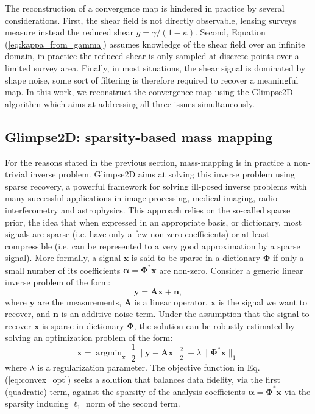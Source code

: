 \documentclass[iop,twocolappendix]{emulateapj}
\DeclareMathOperator*{\argmin}{argmin}
\begin{document}
The reconstruction of a convergence map is hindered in practice by several considerations. First, 
the shear field is not directly observable, lensing surveys measure instead the reduced shear 
$g=\gamma/(1-\kappa)$. Second, Equation (\ref{eq:kappa_from_gamma}) assumes knowledge of the 
shear field over an infinite domain, in practice the reduced shear is only sampled at discrete 
points over a limited survey area. Finally, in most situations, the shear signal is dominated 
by shape noise, some sort of filtering is therefore required to recover a meaningful map. In this 
work, we reconstruct the convergence map using the Glimpse2D algorithm \citep{LSL.etal.2016} which 
aims at addressing all three issues simultaneously.

\subsection{Glimpse2D: sparsity-based mass mapping}\label{ssec:glimpse}
For the reasons stated in the previous section, mass-mapping is in practice a non-trivial inverse 
problem. Glimpse2D aims at solving  this inverse problem using sparse recovery, a powerful 
framework for solving ill-posed inverse problems with many successful applications in image 
processing, medical imaging, radio-interferometry and astrophysics. This approach relies on 
the so-called sparse prior, the idea that when expressed in an appropriate basis, or dictionary, 
most signals are sparse (i.e. have only a few non-zero coefficients) or at least compressible 
(i.e. can be represented  to a very good approximation by a sparse signal). More formally, a 
signal $\bm{x}$ is said to be sparse in a dictionary $\mathbf{\Phi}$ if only a small number 
of its coefficients $\bm{\alpha} = \mathbf{\Phi}^* \bm{x}$  are non-zero. Consider a 
generic linear inverse problem of the form:
 \begin{equation}
  \bm{y} = \bm{A}\bm{x} + \bm{n},
\label{eq:gen_lin_inverse}
\end{equation}
where $\bm{y}$ are the measurements, $\bm{A}$ is a linear operator, $\bm{x}$ is the signal
we want to recover, and $\bm{n}$ is an additive noise term.  Under the assumption that  the 
signal to recover $\bm{x}$ is sparse in dictionary $\mathbf{\Phi}$, the solution can be 
robustly estimated by solving an optimization problem  of the form:
\begin{equation}
  \overline{\bm{x}} = \argmin_{\bm{x}}\;\frac{1}{2} \lVert\bm{y} - \bm{A}\bm{x}\rVert_2^2 + 
                 \lambda \lVert\bm{\Phi}^*\bm{x}\rVert_1\,
\label{eq:convex_opt}
\end{equation}
where $\lambda$ is a regularization parameter. The objective function in Eq. (\ref{eq:convex_opt}) 
seeks a solution that balances data fidelity, via the first (quadratic) term, against the sparsity 
of the analysis coefficients $\bm\alpha=\bm{\Phi}^*\bm{x}$ via the sparsity inducing $\ell_1$ 
norm of the second term. 
\end{document}
